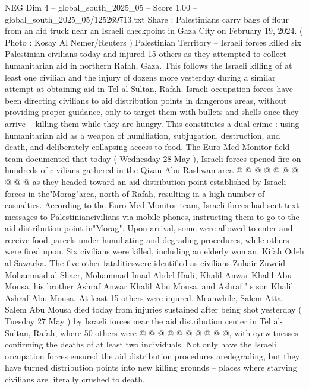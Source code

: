 \begin{textsample}{NEG Dim 4 – global\_south\_2025\_05 – Score 1.00 – global\_south\_2025\_05/125269713.txt}  \label{ex:f4_neg_363}
Share : Palestinians carry bags of flour from an aid truck near an Israeli checkpoint in Gaza City on February 19, 2024. ( Photo : Kosay Al Nemer/Reuters ) Palestinian Territory -- Israeli forces killed six Palestinian civilians today and injured 15 others as they attempted to collect humanitarian aid in northern Rafah, Gaza.
This follows the Israeli killing of at least one civilian and the injury of dozens more yesterday during a similar attempt at obtaining aid in Tel al-Sultan, Rafah.
Israeli occupation forces have been directing civilians to aid distribution points in dangerous areas, without providing proper guidance, only to target them with bullets and shells once they arrive -- killing them while they are hungry.
This constitutes a dual crime : using humanitarian aid as a weapon of humiliation, subjugation, destruction, and death, and deliberately collapsing access to food.
The Euro-Med Monitor field team documented that today ( Wednesday 28 May ), Israeli forces opened fire on hundreds of civilians gathered in the Qizan Abu Rashwan area @ @ @ @ @ @ @ @ @ @ as they headed toward an aid distribution point established by Israeli forces in the"Morag"area, north of Rafah, resulting in a high number of casualties.
According to the Euro-Med Monitor team, Israeli forces had sent text messages to Palestiniancivilians via mobile phones, instructing them to go to the aid distribution point in"Morag".
Upon arrival, some were allowed to enter and receive food parcels under humiliating and degrading procedures, while others were fired upon.
Six civilians were killed, including an elderly woman, Kifah Odeh al-Sawarka.
The five other fatalitieswere identified as civilians Zuhair Zuweid Mohammad al-Shaer, Mohammad Imad Abdel Hadi, Khalil Anwar Khalil Abu Mousa, his brother Ashraf Anwar Khalil Abu Mousa, and Ashraf ' s son Khalil Ashraf Abu Mousa.
At least 15 others were injured.
Meanwhile, Salem Atta Salem Abu Mousa died today from injuries sustained after being shot yesterday ( Tuesday 27 May ) by Israeli forces near the aid distribution center in Tel al-Sultan, Rafah, where 50 others were @ @ @ @ @ @ @ @ @ @, with eyewitnesses confirming the deaths of at least two individuals.
Not only have the Israeli occupation forces ensured the aid distribution procedures aredegrading, but they have turned distribution points into new killing grounds -- places where starving civilians are literally crushed to death.

\end{textsample}
